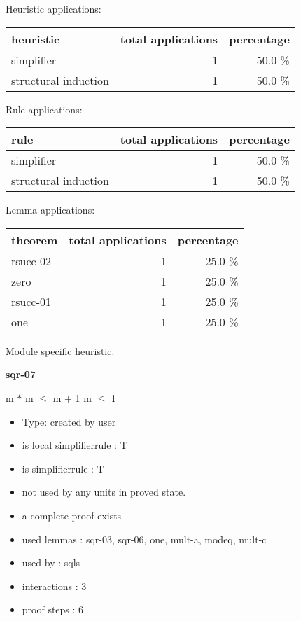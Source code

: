 \documentclass[a4paper]{article}
\begin{document}
\medskip


Heuristic applications:

\begin{supertabular}{l|r|r}
heuristic	& total applications & percentage \\ \hline
simplifier & 1 & 50.0 \% \\
structural induction & 1 & 50.0 \% \\

\end{supertabular}

Rule applications:

\begin{supertabular}{l|r|r}
rule	        & total applications & percentage \\ \hline
simplifier & 1 & 50.0 \% \\
structural induction & 1 & 50.0 \% \\

\end{supertabular}

Lemma applications:

\begin{supertabular}{l|r|r}
theorem	        & total applications & percentage \\ \hline
rsucc-02 & 1 & 25.0 \% \\
zero & 1 & 25.0 \% \\
rsucc-01 & 1 & 25.0 \% \\
one & 1 & 25.0 \% \\

\end{supertabular}

Module specific heuristic:

\pagebreak

{\LARGE\bf sqr-07}\label{lemma-sqr-07}

\medskip

 \Fol m $*$ m $\le$ m + 1 \Equiv m $\le$ 1

\begin{itemize}

\item Type: created by user

\item is local simplifierrule : T
\item is simplifierrule : T
\item not used by any units in proved state.
\item       a complete proof exists
\item       used lemmas  : sqr-03, sqr-06, one, mult-a, modeq, mult-c
\item       used by      : sqls
\item       interactions : 3
\item       proof steps  : 6
\end{itemize}
\end{document}
